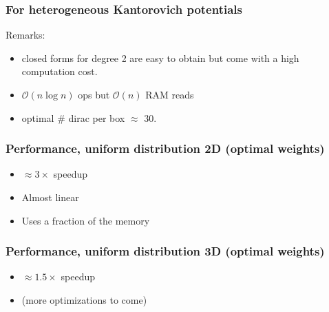 \documentclass[aspectratio=169]{beamer}
\begin{document}
\begin{frame}
    \frametitle{For heterogeneous Kantorovich potentials}

    Remarks:
    \begin{itemize}
        \item closed forms for degree 2 are easy to obtain but come with a high computation cost.
        \item $\mathcal{O}( n \log{} n )$ ops but $\mathcal{O}( n )$ RAM reads
        \item optimal $\#$ dirac per box $\approx$ 30.
    \end{itemize}
\end{frame}


\begin{frame}
    \frametitle{Performance, uniform distribution 2D (optimal weights)}

    \begin{minipage}[c][0.6\textheight][c]{0.55\textwidth}
        
    \end{minipage}
    \begin{minipage}[c][0.6\textheight][c]{0.4\textwidth}
        \begin{itemize}
            \item $\approx 3 \times$ speedup

            \bigskip
            \item Almost linear

            \bigskip
            \item Uses a fraction of the memory
        \end{itemize}
    \end{minipage}
\end{frame}

\begin{frame}
    \frametitle{Performance, uniform distribution 3D (optimal weights)}

    \begin{minipage}[c][0.6\textheight][c]{0.55\textwidth}
        
    \end{minipage}
    \begin{minipage}[c][0.6\textheight][c]{0.4\textwidth}
        \begin{itemize}
            \item $\approx 1.5 \times$ speedup
            
            \bigskip{}
            \item (more optimizations to come)
        \end{itemize}
    \end{minipage}
\end{frame}
\end{document}
